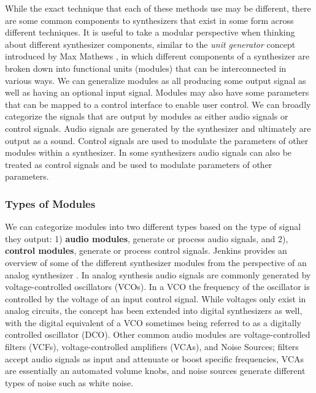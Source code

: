 While the exact technique that each of these methods use may be different, there are some common components to synthesizers that exist in some form across different techniques. It is useful to take a modular perspective when thinking about different synthesizer components, similar to the \textit{unit generator} concept introduced by Max Mathews \cite{roads1980interview}, in which different components of a synthesizer are broken down into functional units (modules) that can be interconnected in various ways. We can generalize modules as all producing some output signal as well as having an optional input signal. Modules may also have some parameters that can be mapped to a control interface to enable user control. We can broadly categorize the signals that are output by modules as either audio signals or control signals. Audio signals are generated by the synthesizer and ultimately are output as a sound. Control signals are used to modulate the parameters of other modules within a synthesizer. In some synthesizers audio signals can also be treated as control signals and be used to modulate parameters of other parameters.

\subsubsection{Types of Modules}
We can categorize modules into two different types based on the type of signal they output: 1) \textbf{audio modules}, generate or process audio signals, and 2), \textbf{control modules}, generate or process control signals. Jenkins provides an overview of some of the different synthesizer modules from the perspective of an analog synthesizer \cite{jenkins2019analog}. In analog synthesis audio signals are commonly generated by voltage-controlled oscillators (VCOs). In a VCO the frequency of the oscillator is controlled by the voltage of an input control signal. While voltages only exist in analog circuits, the concept has been extended into digital synthesizers as well, with the digital equivalent of a VCO sometimes being referred to as a digitally controlled oscillator (DCO). Other common audio modules are voltage-controlled filters (VCFs), voltage-controlled amplifiers (VCAs), and Noise Sources; filters accept audio signals as input and attenuate or boost specific frequencies, VCAs are essentially an automated volume knobs, and noise sources generate different types of noise such as white noise.

